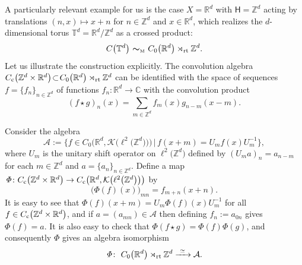 \documentclass[10pt,a4paper]{amsart}
\numberwithin{equation}{section}
\newcommand{\Z}{\zed}
\newcommand{\mbf}[1]{{\boldsymbol {#1} }}
\newcommand{\CK}{\mathcal{K}}
\newcommand{\sfH}{\mathsf{H}}
\newcommand{\rt}{{\rm rt}}
\newcommand{\R}{\real}
\newcommand{\complex}{{\mathbb C}} %
\newcommand{\zed}{{\mathbb Z}} %
\newcommand{\real}{{\mathbb R}} %
\newcommand{\torus}{{\mathbb T}} %
\def\alg{{\mathcal A}}
\begin{document}
\begin{Example}[tori]\label{ex:Moritatori}
A particularly relevant example for us is the case $X=\real^d$ with
$\sfH=\zed^d$ acting by translations $(n,x)\mapsto x+n$ for
$n\in\zed^d$ and $x\in\real^d$, which realizes the
$d$-dimensional torus $\torus^d=\real^d/\zed^d$ as a crossed product:
\[
C\big(\torus^d\big) \ \mbf\sim_{\text{\tiny M}} \ C_0\big(\real^d\big)\rtimes_\rt \zed^d .
\]
Let us illustrate the construction explicitly. The convolution algebra
$C_{\rm c}\big(\Z^d\times\real^d\big)\!\subset\! C_0\big(\R^d\big)\rtimes_\rt\Z^d$ can be
identified with the space of sequences $f=\{f_n\}_{n\in\Z^d}$ of
functions $f_n\colon \real^d\to\complex$ with the convolution product
\[
(f\star g)_n(x) = \sum_{m\in\Z^d} f_m(x) g_{n-m}(x-m) .
\]

Consider the algebra
\[
\alg:=\big\{f\in C_0\big(\real^d,\CK\big(\ell^2\big(\zed^d\big)\big)\big) \, \big| \, f(x+m)
= U_m f(x) U_{m}^{-1}\big\} ,
\]
where $U_m$ is the unitary shift operator on $\ell^2\big(\zed^d\big)$ defined by
$(U_ma)_n=a_{n-m}$ for each $m\in\Z^d$ and $a=\{a_n\}_{n\in\Z^d}$.
Define a map ${\mathit\Phi}\colon C_{\rm c}\big(\Z^d\times\real^d\big)\to
C_{\rm c}\big(\real^d,\CK\big(\ell^2\big(\Z^d\big)\big)\big)$ by
\[
\big({\mathit\Phi}(f)(x)\big)_{mn} = f_{m+n}(x+n) .
\]
It is easy to see that ${\mathit\Phi}(f)(x+m) =
U_m {\mathit\Phi}(f)(x) U_m^{-1}$ for all $f\in C_{\rm
 c}\big(\zed^d\times\real^d\big)$, and if $a=(a_{mn})\in\alg$ then defining
$f_n:=a_{0n}$ gives ${\mathit\Phi}(f)=a$. It is also easy to check that
${\mathit\Phi}(f\star g) = {\mathit\Phi}(f) {\mathit\Phi}(g)$, and consequently
$\mathit\Phi$ gives an algebra isomorphism
\[
{\mathit\Phi}\colon \ C_0\big(\real^d\big)\rtimes_\rt\zed^d \xrightarrow{ \ \simeq \ } \alg .
\]


\end{Example}
\end{document}
